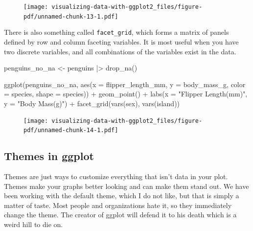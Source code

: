 \documentclass[
  letterpaper,
  DIV=11,
  numbers=noendperiod,
  oneside]{scrreprt}
\newenvironment{Shaded}{\begin{snugshade}}{\end{snugshade}}
\newcommand{\AttributeTok}[1]{\textcolor[rgb]{0.40,0.45,0.13}{#1}}
\newcommand{\FunctionTok}[1]{\textcolor[rgb]{0.28,0.35,0.67}{#1}}
\newcommand{\NormalTok}[1]{\textcolor[rgb]{0.00,0.23,0.31}{#1}}
\newcommand{\OtherTok}[1]{\textcolor[rgb]{0.00,0.23,0.31}{#1}}
\newcommand{\SpecialCharTok}[1]{\textcolor[rgb]{0.37,0.37,0.37}{#1}}
\newcommand{\StringTok}[1]{\textcolor[rgb]{0.13,0.47,0.30}{#1}}
\begin{document}
\begin{figure}[H]

{\centering \texttt{[image: visualizing-data-with-ggplot2\_files/figure-pdf/unnamed-chunk-13-1.pdf]}

}

\end{figure}

There is also something called \texttt{facet\_grid}, which forms a
matrix of panels defined by row and column faceting variables. It is
most useful when you have two discrete variables, and all combinations
of the variables exist in the data.

\begin{Shaded}
\begin{Highlighting}[]
\NormalTok{penguins\_no\_na }\OtherTok{\textless{}{-}}\NormalTok{ penguins }\SpecialCharTok{|\textgreater{}}
\FunctionTok{drop\_na}\NormalTok{()}

\FunctionTok{ggplot}\NormalTok{(penguins\_no\_na,}
      \FunctionTok{aes}\NormalTok{(}\AttributeTok{x =}\NormalTok{ flipper\_length\_mm,}
         \AttributeTok{y =}\NormalTok{ body\_mass\_g,}
         \AttributeTok{color =}\NormalTok{ species,}
         \AttributeTok{shape =}\NormalTok{ species)) }\SpecialCharTok{+}
\FunctionTok{geom\_point}\NormalTok{() }\SpecialCharTok{+}
\FunctionTok{labs}\NormalTok{(}\AttributeTok{x =} \StringTok{"Flipper Length(mm)"}\NormalTok{, }\AttributeTok{y =} \StringTok{"Body Mass(g)"}\NormalTok{) }\SpecialCharTok{+}
\FunctionTok{facet\_grid}\NormalTok{(}\FunctionTok{vars}\NormalTok{(sex), }\FunctionTok{vars}\NormalTok{(island))}
\end{Highlighting}
\end{Shaded}

\begin{figure}[H]

{\centering \texttt{[image: visualizing-data-with-ggplot2\_files/figure-pdf/unnamed-chunk-14-1.pdf]}

}

\end{figure}

\hypertarget{themes-in-ggplot}{%
\subsection{Themes in ggplot}\label{themes-in-ggplot}}

Themes are just ways to customize everything that isn't data in your
plot. Themes make your graphs better looking and can make them stand
out. We have been working with the default theme, which I do not like,
but that is simply a matter of taste. Most people and organizations hate
it, so they immediately change the theme. The creator of ggplot will
defend it to his death which is a weird hill to die on.
\end{document}

